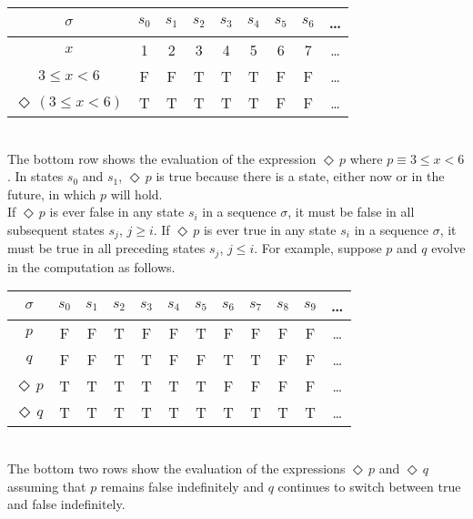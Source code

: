 \documentclass[fleqn, leqno]{article}
\newcommand{\Event}{\Diamond\,}
\begin{document}
\begin{tabular}{c|cccccccc}
  $\sigma$                  & $s_0$ & $s_1$ & $s_2$ & $s_3$ & $s_4$ & $s_5$ & $s_6$ & \dots \\
  \hline
  $x$                       & 1     & 2     & 3     & 4     & 5     & 6     & 7     &  \dots\\
  $3\le x<6$                & F     & F     & T     & T     & T     & F     & F     &  \dots\\
  $\Event(3\le x<6)$        & T     & T     & T     & T     & T     & F     & F     &  \dots\\
\end{tabular}\\

The bottom row shows the evaluation of the expression $\Event p$ where $p\equiv 3\le x<6$.
In states $s_0$ and $s_1$, $\Event p$ is true because there is a state, either now or in the future, in which $p$ will hold.\\

If $\Event p$ is ever false in any state $s_i$ in a sequence $\sigma$, it must be false in all subsequent states $s_j$, $j\ge i$.
If $\Event p$ is ever true in any state $s_i$ in a sequence $\sigma$, it must be true in all preceding states $s_j$, $j\le i$.
For example, suppose $p$ and $q$ evolve in the computation as follows.\\

\begin{tabular}{c|ccccccccccc}
  $\sigma$       & $s_0$ & $s_1$ & $s_2$ & $s_3$ & $s_4$ & $s_5$ & $s_6$ & $s_7$ & $s_8$& $s_9$  & \dots \\
  \hline
  $p$            & F     & F     & T     & F     & F     & T     & F     & F     & F     & F     &  \dots\\
  $q$            & F     & F     & T     & T     & F     & F     & T     & T     & F     & F     &  \dots\\
  $\Event p$     & T     & T     & T     & T     & T     & T     & F     & F     & F     & F     &  \dots\\
  $\Event q$     & T     & T     & T     & T     & T     & T     & T     & T     & T     & T     &  \dots\\
\end{tabular}\\

The bottom two rows show the evaluation of the expressions $\Event p$ and $\Event q$
assuming that $p$ remains false indefinitely and $q$ continues to switch between true and false indefinitely.\\
\end{document}
